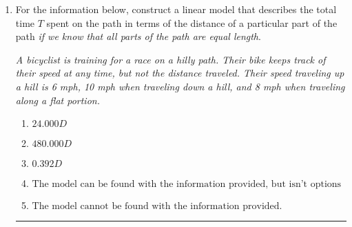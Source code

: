 \documentclass[14pt]{extbook}
\newcommand{\litem}[1]{\item#1\hspace*{-1cm}\rule{\textwidth}{0.4pt}}
\begin{document}
\begin{enumerate}
{\begin{enumerate}[label=\Alph*.]
\end{enumerate} }
\litem{
For the information below, construct a linear model that describes the total time $T$ spent on the path in terms of the distance of a particular part of the path \textit{if we know that all parts of the path are equal length}.
\begin{center}
    \textit{ A bicyclist is training for a race on a hilly path. Their bike keeps track of their speed at any time, but not the distance traveled. Their speed traveling up a hill is 6 mph, 10 mph when traveling down a hill, and 8 mph when traveling along a flat portion. }
\end{center}
\begin{enumerate}[label=\Alph*.]
\item \( 24.000 D \)
\item \( 480.000 D \)
\item \( 0.392 D \)
\item \( \text{The model can be found with the information provided, but isn't options 1-3.} \)
\item \( \text{The model cannot be found with the information provided.} \)

\end{enumerate} }
\end{enumerate}
\end{document}
